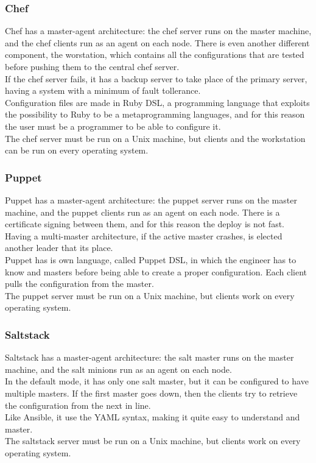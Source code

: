 \documentclass[conference]{IEEEtran}
\begin{document}
\subsubsection{Chef}
Chef has a master-agent architecture: the chef server runs on the master machine, and the chef clients run as an agent on each node. There is even another different component, the worstation, which contains all the configurations that are tested before pushing them to the central chef server.\\
If the chef server fails, it has a backup server to take place of the primary server, having a system with a minimum of fault tollerance.\\
Configuration files are made in Ruby DSL, a programming language that exploits the possibility to Ruby to be a metaprogramming languages, and for this reason the user must be a programmer to be able to configure it.\\
The chef server must be run on a Unix machine, but clients and the workstation can be run on every operating system.\\
\subsubsection{Puppet}
Puppet has a master-agent architecture: the puppet server runs on the master machine, and the puppet clients run as an agent on each node. There is a certificate signing between them, and for this reason the deploy is not fast.\\
Having a multi-master architecture, if the active master crashes, is elected another leader that its place.\\
Puppet has is own language, called Puppet DSL, in which the engineer has to know and masters before being able to create a proper configuration. Each client pulls the configuration from the master.\\
The puppet server must be run on a Unix machine, but clients work on every operating system.\\
\subsubsection{Saltstack}
Saltstack has a master-agent architecture: the salt master runs on the master machine, and the salt minions run as an agent on each node.\\
In the default mode, it has only one salt master, but it can be configured to have multiple masters. If the first master goes down, then the clients try to retrieve the configuration from the next in line.\\
Like Ansible, it use the YAML syntax, making it quite easy to understand and master.\\
The saltstack server must be run on a Unix machine, but clients work on every operating system.\\
\end{document}
